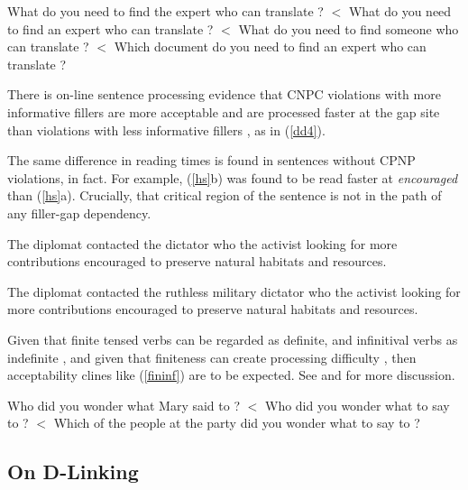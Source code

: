 \documentclass[output=paper
 	        ,biblatex
                ,babelshorthands
                ,newtxmath
                ,draftmode
                ,colorlinks, citecolor=brown
]{langscibook}
\begin{document}
\eal \label{k}
\ex What do you need to find the expert who can translate \spc?  $<$
\ex What do you need to find an expert who can translate \spc?   $<$
\ex What do you need to find someone who can translate \spc? $<$
\ex Which document do you need to find an expert who can translate \spc?
\zl


\indent
There is on-line sentence processing evidence that   CNPC   violations  with more informative  fillers are more acceptable and are processed faster at the gap site than violations with less informative fillers \citep{hofsaglang}, as in  (\ref{dd4}).
 
\eal \label{dd4}
\zl



\noindent
The same difference in reading times  is found in sentences without CPNP violations, in fact. For example,  (\ref{hs}b) was found to be read faster at \emph{encouraged} than (\ref{hs}a). Crucially, that critical region of the sentence is not in the path of any filler-gap dependency.
 
\eal \label{hs}
 \ex The diplomat contacted the dictator who the activist looking for more contributions encouraged to preserve natural habitats and resources.
 
 \ex The diplomat contacted the ruthless military dictator who the activist looking for more contributions encouraged to preserve natural habitats and resources.
 \zl



Given that  finite tensed verbs can be regarded as definite, and infinitival verbs as indefinite \citep{partee84}, and given that finiteness can create processing difficulty 
 \citep{kluender92,gibson0000}, then acceptability clines like 
(\ref{fininf}) are to be expected. See \citet[Chapter 5]{levhubook} and \citet[308]{levine17} for more discussion.

\eal \label{fininf}
\ex Who did you wonder what Mary said to \spc?  $<$
\ex Who did you wonder what to say to \spc?  $<$
\ex Which of the people at the party did you wonder what to say to \spc? 
\zl

\subsection{On D-Linking}
\end{document}
